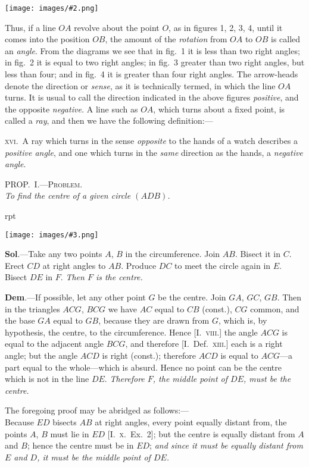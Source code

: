 \documentclass[oneside]{book}
\newcounter{wrapwidth}
\newcommand\myprop[2]{
\bigskip\Needspace*{4\baselineskip}\begin{center}\textsc{#1}\\\medskip\emph{#2}\par\end{center}
}
\newcommand\imgflow[3]{
\setcounter{wrapwidth}{#1}
\begin{wrapfigure}[#2]{r}{\value{wrapwidth}pt}
\begin{center}
\vspace{-0.3in}
\texttt{[image: images/\#3.png]}
\end{center}
\end{wrapfigure}
}
\newcommand\imgcent[2]{
\begin{center}
\texttt{[image: images/\#2.png]}
\end{center}
}
\begin{document}
\imgcent{308}{f103}

Thus, if a line $OA$ revolve about the point $O$, as in
figures 1, 2, 3, 4, until it comes into the position $OB$,
the amount of the \emph{rotation} from $OA$ to $OB$ is called an
\emph{angle}. From the diagrams we see that in fig.~1 it is
less than two right angles; in fig.~2 it is equal to two
right angles; in fig.~3 greater than two right angles,
but less than four; and in fig.~4 it is greater than four
right angles. The arrow-heads denote the direction or
\emph{sense}, as it is technically termed, in which the line $OA$
turns. It is usual to call the direction indicated in the
above figures \emph{positive}, and the opposite \emph{negative.} A line
such as $OA$, which turns about a fixed point, is called
a \emph{ray}, and then we have the following definition:---

\textsc{xvi}.\ A ray which turns in the sense \emph{opposite} to the
hands of a watch describes a \emph{positive angle}, and one
which turns in the \emph{same} direction as the hands, a
\emph{negative angle}.

\myprop{PROP\@.~I.---Problem.}{To find the centre of a given circle $(ADB)$.}

\imgflow{103}{9}{f104}

\textbf{Sol}.---Take any two points $A$, $B$ in the circumference.
Join $AB$. Bisect it in $C$. Erect
$CD$ at right angles to $AB$. Produce
$DC$ to meet the circle again in $E$.
Bisect $DE$ in $F$. \emph{Then $F$ is the
centre.}

\textbf{Dem}.---If possible, let any other
point $G$ be the centre. Join $GA$,
$GC$, $GB$. Then in the triangles
$ACG$, $BCG$ we have $AC$ equal to
$CB$ (const.), $CG$ common, and the
base $GA$ equal to $GB$, because they are drawn from $G$,
which is, by hypothesis, the centre, to the circumference.
Hence [I.\ \textsc{viii}.] the angle $ACG$ is equal to
the adjacent angle $BCG$, and therefore [I.\ Def.\ \textsc{xiii}.]
each is a right angle; but the angle $ACD$ is right
(const.); therefore $ACD$ is equal to $ACG$---a part equal
to the whole---which is absurd. Hence no point can
be the centre which is not in the line $DE$. \emph{Therefore $F$,
the middle point of $DE$, must be the centre.}

The foregoing proof may be abridged as follows:---\\
Because $ED$ bisects $AB$ at right angles, every point
equally distant from, the points $A$, $B$ must lie in $ED$
[I.\ \textsc{x.}\ Ex.\ 2]; but the centre is equally distant from
$A$ and $B$; hence the centre must be in $ED$; \emph{and since
it must be equally distant from $E$ and $D$, it must be the
middle point of $DE$.}
\end{document}

